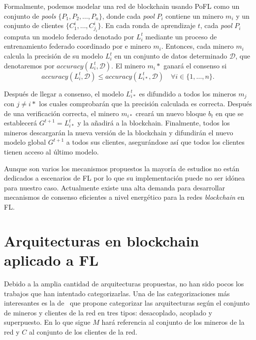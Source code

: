 Formalmente, podemos modelar una red de blockchain usando \ac{PoFL} como un conjunto de \textit{pools} $\{P_1, P_2, \ldots, P_n\}$, donde cada \textit{pool} $P_i$ contiene un minero $m_i$ y un conjunto de clientes $\{C_1^i, \ldots, C_{j_i}^i\}$. En cada ronda de aprendizaje $t$, cada \textit{pool} $P_i$ computa un modelo federado denotado por $L_i^t$ mediante un proceso de entrenamiento federado coordinado por e minero $m_i$. Entonces, cada minero $m_i$ calcula la precisión de su modelo $L_i^t$ en un conjunto de datos determinado $\mathcal{D}$, que denotaremos por $accuracy(L_i^t, \mathcal{D})$. El minero $m_i*$ ganará el consenso si
\begin{equation}
	accuracy(L_i^t, \mathcal{D}) \le accuracy(L_{i*}^t, \mathcal{D}) \quad \forall i \in \{ 1, \ldots, n\}.
\end{equation}

Después de llegar a consenso, el modelo $L_{i*}^t$ es difundido a todos los mineros $m_j$ con $j \ne i*$ los cuales comprobarán que la precisión calculada es correcta. Después de una verificación correcta, el minero $m_{i*}$ creará un nuevo bloque $b_t$ en que se establecerá $G^{t+1}=L_{i*}^t$ y la añadirá a la blockchain. Finalmente, todos los mineros descargarán la nueva versión de la blockchain y difundirán el nuevo modelo global $G^{t+1}$ a todos sus clientes, asegurándose así que todos los clientes tienen acceso al último modelo.


Aunque son varios los mecanismos propuestos la mayoría de estudios no están dedicados a escenarios de \ac{FL} por lo que su implementación puede no ser idónea para nuestro caso. Actualmente existe una alta demanda para desarrollar mecanismos de consenso eficientes a nivel energético para la redes \textit{blockchain} en \ac{FL}.

\section{Arquitecturas en blockchain aplicado a FL}

Debido a la amplia cantidad de arquitecturas propuestas, no han sido pocos los trabajos que han intentado categorizarlas. Una de las categorizaciones más interesantes es la de~\citet{zhu-2023-blockfed} que propone categorizar las arquitecturas según el conjunto de mineros y clientes de la red en tres tipos: desacoplado, acoplado y superpuesto. En lo que sigue $M$ hará referencia al conjunto de los mineros de la red y $C$ al conjunto de los clientes de la red.

